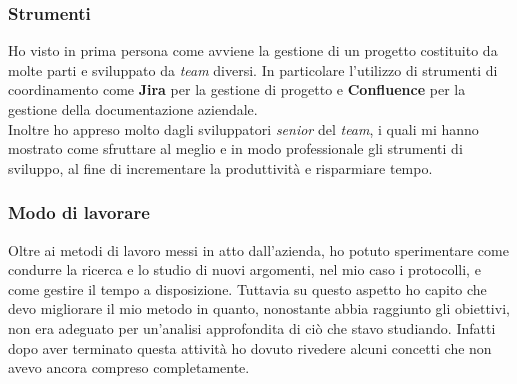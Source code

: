 \subsubsection{Strumenti}
Ho visto in prima persona come avviene la gestione di un progetto costituito da molte parti e sviluppato da \textit{team} diversi. In particolare l'utilizzo di strumenti di coordinamento come \textbf{Jira} per la gestione di progetto e \textbf{Confluence} per la gestione della documentazione aziendale. \\
Inoltre ho appreso molto dagli sviluppatori \textit{senior} del \textit{team}, i quali mi hanno mostrato come sfruttare al meglio e in modo professionale gli strumenti di sviluppo, al fine di incrementare la produttività e risparmiare tempo.

\subsubsection{Modo di lavorare}
Oltre ai metodi di lavoro messi in atto dall'azienda, ho potuto sperimentare come condurre la ricerca e lo studio di nuovi argomenti, nel mio caso i protocolli, e come gestire il tempo a disposizione. Tuttavia su questo aspetto ho capito che devo migliorare il mio metodo in quanto, nonostante abbia raggiunto gli obiettivi, non era adeguato per un'analisi approfondita di ciò che stavo studiando. Infatti dopo aver terminato questa attività ho dovuto rivedere alcuni concetti che non avevo ancora compreso completamente.
